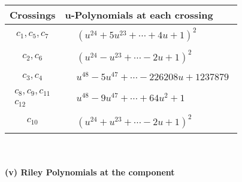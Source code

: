 \documentclass[1p]{elsarticle_modified}
\theoremstyle{definition}
\begin{document}
\begin{tabular}{m{50pt}|m{274pt}}
Crossings & \hspace{64pt}u-Polynomials at each crossing \\
\hline $$\begin{aligned}c_{1},c_{5},c_{7}\end{aligned}$$&$\begin{aligned}
&(u^{24}+5 u^{23}+\cdots+4 u+1)^{2}
\end{aligned}$\\
\hline $$\begin{aligned}c_{2},c_{6}\end{aligned}$$&$\begin{aligned}
&(u^{24}- u^{23}+\cdots-2 u+1)^{2}
\end{aligned}$\\
\hline $$\begin{aligned}c_{3},c_{4}\end{aligned}$$&$\begin{aligned}
&u^{48}-5 u^{47}+\cdots-226208 u+1237879
\end{aligned}$\\
\hline $$\begin{aligned}c_{8},c_{9},c_{11}\\c_{12}\end{aligned}$$&$\begin{aligned}
&u^{48}-9 u^{47}+\cdots+64 u^2+1
\end{aligned}$\\
\hline $$\begin{aligned}c_{10}\end{aligned}$$&$\begin{aligned}
&(u^{24}+u^{23}+\cdots-2 u+1)^{2}
\end{aligned}$\\
\hline
\end{tabular}\\~\\
\newpage\renewcommand{\arraystretch}{1}
\flushleft \textbf{(v) Riley Polynomials at the component}\newline \\
\end{document}
